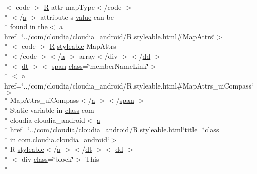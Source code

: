 \begin{DoxyCompactItemize}
$<$ code $>$ \hyperlink{index-16_8html_a31e8fe59be5c20ce90a0090e28a0c1fe}{R} attr map\-Type$<$/code $>$\\*
$<$/\hyperlink{style_8css_a5e8981582017bb8b84c21f148345d1f7}{a} $>$ attribute s \hyperlink{_my_s_q_l_connector_8measure_8html_afcc7a4b78ecd8fa7e713f8cfa0f51017}{value} can be \\*
found in the$<$ \hyperlink{style_8css_a5e8981582017bb8b84c21f148345d1f7}{a} href=\char`\"{}../com/cloudia/cloudia\-\_\-android/R.\-styleable.\-html\#Map\-Attrs\char`\"{}$>$\\*
$<$ code $>$ \hyperlink{index-16_8html_a31e8fe59be5c20ce90a0090e28a0c1fe}{R} \hyperlink{index-17_8html_ae6c9bf1e41380184b4b665ca9ab6ba0a}{styleable} Map\-Attrs\\*
$<$/code $>$$<$/\hyperlink{style_8css_a5e8981582017bb8b84c21f148345d1f7}{a} $>$ array$<$/div $>$$<$/\hyperlink{stylesheet_8css_a47f4718a86835a7771ec592ece845221}{dd} $>$\\*
$<$ \hyperlink{stylesheet_8css_a107565fb4039d33b041380d6e0ea1d80}{dt} $>$$<$ \hyperlink{stylesheet_8css_a8343996ebcf16220b04e54659aac31cc}{span} \hyperlink{_tools_8html_acf06f836132665ba8114f5a414c2403f}{class}=\char`\"{}member\-Name\-Link\char`\"{}$>$\\*
$<$ a href=\char`\"{}../com/cloudia/cloudia\-\_\-android/R.\-styleable.\-html\#Map\-Attrs\-\_\-ui\-Compass\char`\"{}$>$\\*
 Map\-Attrs\-\_\-ui\-Compass$<$/\hyperlink{style_8css_a5e8981582017bb8b84c21f148345d1f7}{a} $>$$<$/\hyperlink{stylesheet_8css_a8343996ebcf16220b04e54659aac31cc}{span} $>$\\*
 Static variable in \hyperlink{_tools_8html_acf06f836132665ba8114f5a414c2403f}{class} com \\*
cloudia cloudia\-\_\-android$<$ \hyperlink{style_8css_a5e8981582017bb8b84c21f148345d1f7}{a} \\*
href=\char`\"{}../com/cloudia/cloudia\-\_\-android/R.\-styleable.\-html\char`\"{}title=\char`\"{}class \\*
in com.\-cloudia.\-cloudia\-\_\-android\char`\"{}$>$\\*
 R \hyperlink{index-17_8html_ae6c9bf1e41380184b4b665ca9ab6ba0a}{styleable}$<$/\hyperlink{style_8css_a5e8981582017bb8b84c21f148345d1f7}{a} $>$$<$/\hyperlink{stylesheet_8css_a107565fb4039d33b041380d6e0ea1d80}{dt} $>$$<$ \hyperlink{stylesheet_8css_a47f4718a86835a7771ec592ece845221}{dd} $>$\\*
$<$ div \hyperlink{_tools_8html_acf06f836132665ba8114f5a414c2403f}{class}=\char`\"{}block\char`\"{}$>$ This \\*

\end{DoxyCompactItemize}
